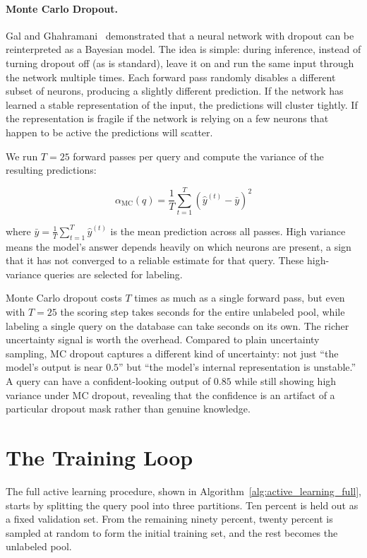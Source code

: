 \paragraph{Monte Carlo Dropout.} Gal and Ghahramani~\cite{gal2016dropout} demonstrated that a neural network with dropout can be reinterpreted as a Bayesian model. The idea is simple: during inference, instead of turning dropout off (as is standard), leave it on and run the same input through the network multiple times. Each forward pass randomly disables a different subset of neurons, producing a slightly different prediction. If the network has learned a stable representation of the input, the predictions will cluster tightly. If the representation is fragile if the network is relying on a few neurons that happen to be active the predictions will scatter.

We run $T = 25$ forward passes per query and compute the variance of the resulting predictions:

\begin{equation}
\alpha_{\text{MC}}(q) = \frac{1}{T} \sum_{t=1}^T \left(\hat{y}^{(t)} - \bar{y}\right)^2
\end{equation}

where $\bar{y} = \frac{1}{T}\sum_{t=1}^T \hat{y}^{(t)}$ is the mean prediction across all passes. High variance means the model's answer depends heavily on which neurons are present, a sign that it has not converged to a reliable estimate for that query. These high-variance queries are selected for labeling.

Monte Carlo dropout costs $T$ times as much as a single forward pass, but even with $T = 25$ the scoring step takes seconds for the entire unlabeled pool, while labeling a single query on the database can take seconds on its own. The richer uncertainty signal is worth the overhead. Compared to plain uncertainty sampling, MC dropout captures a different kind of uncertainty: not just ``the model's output is near $0.5$'' but ``the model's internal representation is unstable.'' A query can have a confident-looking output of $0.85$ while still showing high variance under MC dropout, revealing that the confidence is an artifact of a particular dropout mask rather than genuine knowledge.


\section{The Training Loop}

The full active learning procedure, shown in Algorithm~\ref{alg:active_learning_full}, starts by splitting the query pool into three partitions. Ten percent is held out as a fixed validation set. From the remaining ninety percent, twenty percent is sampled at random to form the initial training set, and the rest becomes the unlabeled pool.

